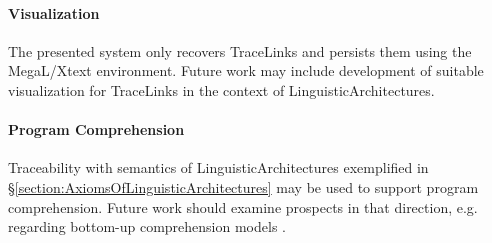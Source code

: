 \paragraph*{Visualization}
The presented system only recovers \glspl{TraceLink} and persists them using the \gls{MegaL/Xtext} environment.
Future work may include development of suitable visualization for \glspl{TraceLink} in the context of \glspl{LinguisticArchitecture}.

\paragraph*{Program Comprehension}
\Gls{Traceability} with semantics of \glspl{LinguisticArchitecture} exemplified in §\ref{section:AxiomsOfLinguisticArchitectures} may be used to support program comprehension.
Future work should examine prospects in that direction, e.g. regarding bottom-up comprehension models \cite{DBLP:conf/wcre/Siegmund16}.
